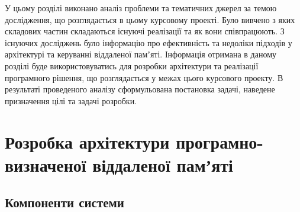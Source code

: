 У цьому розділі виконано аналіз проблеми та тематичних джерел за темою дослідження, що розглядається в цьому курсовому проекті. Було вивчено з яких складових частин складаються існуючі реалізації та як вони співпрацюють. З існуючих досліджень було інформацію про ефективність та недоліки підходів у архітектурі та керуванні віддаленої памʼяті. Інформація отримана в даному розділі буде використовуватись для розробки архітектури та реалізації програмного рішення, що розглядається у межах цього курсового проекту. В результаті проведеного аналізу сформульована постановка задачі, наведене призначення цілі та задачі розробки.

\chapter{Розробка архітектури програмно-визначеної віддаленої памʼяті}

\section{Компоненти системи}

